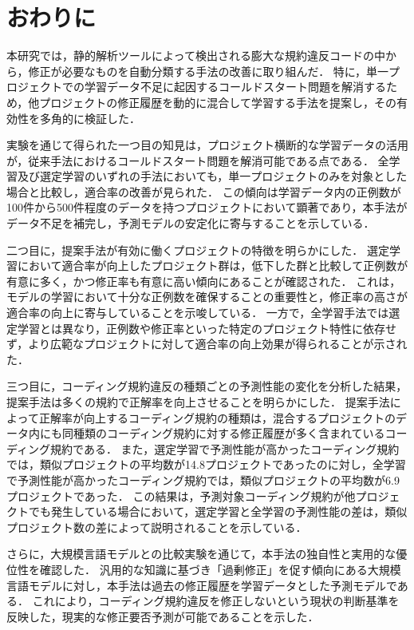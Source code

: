 \documentclass[11pt]{jreport}
\begin{document}
\chapter{おわりに}\label{chap:end}

本研究では，静的解析ツールによって検出される膨大な規約違反コードの中から，修正が必要なものを自動分類する手法の改善に取り組んだ．
特に，単一プロジェクトでの学習データ不足に起因するコールドスタート問題を解消するため，他プロジェクトの修正履歴を動的に混合して学習する手法を提案し，その有効性を多角的に検証した．

実験を通じて得られた一つ目の知見は，プロジェクト横断的な学習データの活用が，従来手法におけるコールドスタート問題を解消可能である点である．
全学習及び選定学習のいずれの手法においても，単一プロジェクトのみを対象とした場合と比較し，適合率の改善が見られた．
この傾向は学習データ内の正例数が100件から500件程度のデータを持つプロジェクトにおいて顕著であり，本手法がデータ不足を補完し，予測モデルの安定化に寄与することを示している．

二つ目に，提案手法が有効に働くプロジェクトの特徴を明らかにした．
選定学習において適合率が向上したプロジェクト群は，低下した群と比較して正例数が有意に多く，かつ修正率も有意に高い傾向にあることが確認された．
これは，モデルの学習において十分な正例数を確保することの重要性と，修正率の高さが適合率の向上に寄与していることを示唆している．
一方で，全学習手法では選定学習とは異なり，正例数や修正率といった特定のプロジェクト特性に依存せず，より広範なプロジェクトに対して適合率の向上効果が得られることが示された．

三つ目に，コーディング規約違反の種類ごとの予測性能の変化を分析した結果，提案手法は多くの規約で正解率を向上させることを明らかにした．
提案手法によって正解率が向上するコーディング規約の種類は，混合するプロジェクトのデータ内にも同種類のコーディング規約に対する修正履歴が多く含まれているコーディング規約である．
また，選定学習で予測性能が高かったコーディング規約では，類似プロジェクトの平均数が14.8プロジェクトであったのに対し，全学習で予測性能が高かったコーディング規約では，類似プロジェクトの平均数が6.9プロジェクトであった．
この結果は，予測対象コーディング規約が他プロジェクトでも発生している場合において，選定学習と全学習の予測性能の差は，類似プロジェクト数の差によって説明されることを示している．

さらに，大規模言語モデルとの比較実験を通じて，本手法の独自性と実用的な優位性を確認した．
汎用的な知識に基づき「過剰修正」を促す傾向にある大規模言語モデルに対し，本手法は過去の修正履歴を学習データとした予測モデルである．
これにより，コーディング規約違反を修正しないという現状の判断基準を反映した，現実的な修正要否予測が可能であることを示した．
\end{document}

